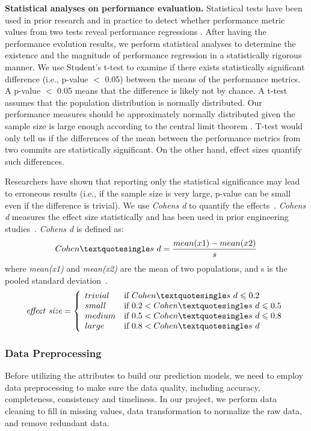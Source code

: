 \textbf{Statistical analyses on performance evaluation.}
Statistical tests have been used in prior research and in practice to detect whether performance metric values from two tests reveal performance regressions \cite{AlGhmadi}. After having the performance evolution results, we perform statistical analyses to determine the existence and the magnitude of performance regression in a statistically rigorous manner. 
We use Student’s t-test to examine if there exists statistically significant difference (i.e., p-value $<$ 0.05) between the means of the performance metrics. A p-value $<$ 0.05 means that the difference is likely not by chance. 
A t-test assumes that the population distribution is normally distributed. Our performance measures should be approximately normally distributed given the sample size is large enough according to the central limit theorem \cite{Chen:2014}.
T-test would only tell us if the differences of the mean between the performance metrics from two commits are statistically significant. On the other hand, effect sizes quantify such differences. 

Researchers have shown that reporting only the statistical significance may lead to erroneous results (i.e., if the sample size is very large, p-value can be small even if the difference is trivial). We use \emph{Cohen\textquotesingle s d} to quantify the effects~\cite{ES2006:Becker}. \emph{Cohen\textquotesingle s d} measures the effect size statistically and has been used in prior engineering studies~\cite{IST2007:Kampenes, ICSE2002:Kitchenham}. \emph{Cohen\textquotesingle s d} is defined as:
$$
Cohen\textquotesingle s \ d=\frac{mean(x1)-mean(x2)}{s}
$$
where \emph{mean(x1)} and \emph{mean(x2)} are the mean of two populations, and s is the pooled standard deviation~\cite{JohnWiley:2011}.
$$
\mathit{effect \ size} = \left\{ \begin{array}{ll}
trivial & \textrm{if $Cohen\textquotesingle s \ d  \leqslant 0.2$}\\
small & \textrm{if $0.2 < Cohen\textquotesingle s \ d \leqslant 0.5$}\\
medium& \textrm{if $0.5 < Cohen\textquotesingle s \ d \leqslant 0.8$}\\
large& \textrm{if $0.8 < Cohen\textquotesingle s \ d$}
\end{array} \right.
$$

\subsubsection{Data Preprocessing}
Before utilizing the attributes to build our prediction models, we need to employ data preprocessing to make sure the data quality, including accuracy, completeness, consistency and timeliness. In our project, we perform data cleaning to fill in missing values, data transformation to normalize the raw data, and remove redundant data.

